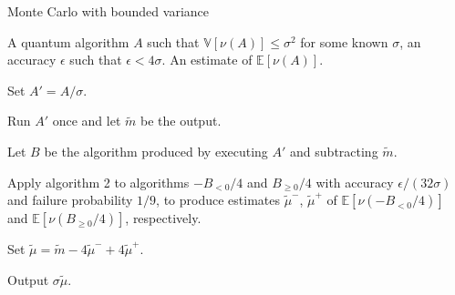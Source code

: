 \documentclass{article}
\begin{document}
\pagestyle{empty}

\begin{algorithm}[ht]
	\caption{Monte Carlo with bounded variance}
	\begin{algorithmic}[1]

		\Require  A quantum algorithm $A$ such that $\mathbb{V}[\nu(A)]\leq \sigma^2$ for some known $\sigma$, an accuracy $\epsilon$ such that $\epsilon<4\sigma$.
		\Ensure An estimate of $\mathbb{E}[\nu(A)]$.
		\vspace{10pt}
		\Statex

		\State Set $A'=A/\sigma$.

		\State Run $A'$ once and let $\widetilde{m}$ be the output.

		 \State Let $B$ be the algorithm produced by executing $A'$ and subtracting $\widetilde{m}$.

	 \State Apply algorithm 2 to algorithms $-B_{<0}/4$ and $B_{\geq 0}/4$ with accuracy $\epsilon/(32\sigma)$ and failure probability $1/9$, to produce estimates $\widetilde{\mu}^-$, $\widetilde{\mu}^+$ of $\mathbb{E}[\nu(-B_{<0}/4)]$ and $\mathbb{E}[\nu(B_{\geq 0}/4)]$, respectively.

		\State Set $\widetilde{\mu}= \widetilde{m}-4\widetilde{\mu}^-+4\widetilde{\mu}^+$.

		\State Output $\sigma \widetilde{\mu}$.

	\end{algorithmic}
\end{algorithm}
\end{document}

